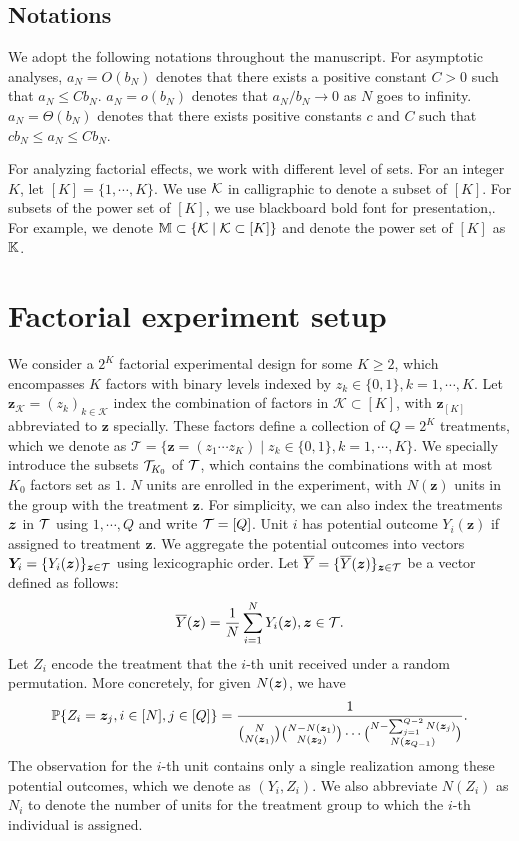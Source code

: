 \documentclass[12pt]{article}
\begin{document}
\subsection{Notations}  

We adopt the following notations throughout the manuscript. For asymptotic analyses, $a_N = {O}(b_N)$ denotes that there exists a positive constant $C>0$ such that $a_N \le Cb_N$. $a_N = o(b_N)$ denotes that $a_N/b_N \to 0$ as $N$ goes to infinity. $a_N =  \Theta(b_N)$ denotes that there exists positive constants $c$ and $C$ such that $cb_N\le a_N \le Cb_N$. 

For analyzing factorial effects,  we work with different level of sets. For an integer $K$, let $[K] = \{1,\cdots,K\}$. We use ${\mathcal{K}}$ in calligraphic to denote a subset of $[K]$. For subsets of the power set of $[K]$, we use blackboard bold font for presentation,. For example, we denote ${\mathbb{M}} \subset \{{\mathcal{K}}\mid {\mathcal{K}}\subset[K]\}$ and denote the power set of $[K]$ as ${\mathbb{K}}$.


\section{Factorial experiment setup}
We consider a $2^K$ factorial experimental design for some $K\ge 2$, which encompasses $K$ factors with binary levels indexed by $z_k\in\{0,1\},k=1,\cdots, K$. Let $\bm{z}_{\mathcal{K}} = (z_k)_{k\in\mathcal{K}}$ index the combination of factors in $\mathcal{K}\subset[K]$, with $\bm{z}_{[K]}$ abbreviated to $\boldsymbol{z}$ specially. These factors define a collection of $Q = 2^K$ treatments, which we denote as $\mathcal{T}=\{\bm{z}=(z_1\cdots z_K)\mid z_k\in\{0,1\}, k=1,\cdots,K\}$. 
We specially introduce the subsets ${\mathcal{T}}_{K_0}$ of ${\mathcal{T}}$, which contains the  combinations with at most $K_0$ factors set as $1$.  $N$ units are enrolled in the experiment, with $N(\bm{z})$ units in the group with the treatment $\bm{z}$. For simplicity, we can also index the treatments ${\boldsymbol{z}}$ in ${\mathcal{T}}$ using $1,\cdots,Q$ and write ${\mathcal{T}} = [Q] $. Unit $i$ has potential outcome $Y_i(\bm{z})$ if assigned to treatment $\bm{z}$. We aggregate the potential outcomes into vectors $\bm{Y}_i = \{Y_i({\boldsymbol{z}})\}_{{\boldsymbol{z}}\in{\mathcal{T}}}$ using lexicographic order. Let $\overline{Y} = \{\overline{Y}({\boldsymbol{z}})\}_{{\boldsymbol{z}}\in{\mathcal{T}}}$ be a vector defined as follows:
\begin{align*}
    \overline{Y}({\boldsymbol{z}}) = \frac{1}{N}\sum_{i=1}^N Y_i({\boldsymbol{z}}),{\boldsymbol{z}}\in{\mathcal{T}}.
\end{align*}
Let $Z_i$ encode the treatment that the $i$-th unit received under a random permutation. More concretely, for given $N({\boldsymbol{z}})$, we have
\begin{align*}
    {\mathbb{P}}\{Z_i = {\boldsymbol{z}}_j, i \in [N], j\in[Q]\} = \frac{1}{{N \choose N({\boldsymbol{z}}_1)}{N - N({\boldsymbol{z}}_1) \choose N({\boldsymbol{z}}_2)}\cdots {N - \sum_{j=1}^{Q-2}N({\boldsymbol{z}}_j) \choose N({\boldsymbol{z}}_{Q-1})} }.
\end{align*}  The observation for the $i$-th unit contains only a single realization among these potential outcomes, which we denote as $(Y_i, {Z}_{i})$. We also abbreviate $N(Z_i)$ as $N_i$ to denote the number of units for the treatment group to which the $i$-th individual is assigned.
\end{document}
